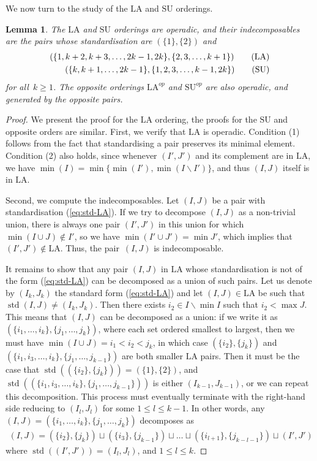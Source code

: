 \documentclass{amsart}
\newtheorem{lemma}[theorem]{Lemma}
\theoremstyle{definition}
\newcommand{\ssm}{\smallsetminus} %
\DeclareMathOperator{\std}{std}
\newcommand{\SU}{\mathrm{SU}}
\newcommand{\LA}{\mathrm{LA}}
\begin{document}
We now turn to the study of the $\LA$ and $\SU$ orderings.

\begin{lemma} 
\label{lem:operadic-ordering}
The $\LA$ and $\SU$ orderings are operadic, and their indecomposables are the pairs whose standardisation are $(\{1\},\{2\})$ and
\begin{align}
(\{1,k+2,k+3,\dots,2k-1,2k\}, \{2,3,\dots,k+1\}) \tag{$\LA$} \label{eq:std-LA} \\
(\{k,k+1,\dots,2k-1\},\{1,2,3,\dots,k-1,2k\}) \tag{$\SU$}
\end{align} 
for all~$k\geq 1$. 
The opposite orderings $\LA^{op}$ and $\SU^{op}$ are also operadic, and generated by the opposite pairs.
\end{lemma}

\begin{proof}
We present the proof for the $\LA$ ordering, the proofs for the $\SU$ and opposite orders are similar.
First, we verify that $\LA$ is operadic. 
Condition (1) follows from the fact that standardising a pair preserves its minimal element.
Condition (2) also holds, since whenever $(I',J')$ and its complement are in $\LA$, we have $\min(I)=\min\{\min(I'),\min(I\ssm I')\}$, and thus $(I,J)$ itself is in $\LA$.

Second, we compute the indecomposables. 
Let $(I,J)$ be a pair with standardisation (\ref{eq:std-LA}).
If we try to decompose $(I,J)$ as a non-trivial union, there is always one pair $(I',J')$ in this union for which~$\min (I\cup J) \notin I'$, so we have $\min ( I' \cup J') = \min J'$, which implies that $(I',J') \notin \LA$.
Thus, the pair~$(I,J)$ is indecomposable. 

It remains to show that any pair $(I,J)$ in $\LA$ whose standardisation is not of the form (\ref{eq:std-LA}) can be decomposed as a union of such pairs. 
Let us denote by $(I_k,J_k)$ the standard form (\ref{eq:std-LA}) and let $(I,J)\in \LA$ be such that $\std(I,J) \neq (I_k,J_k)$.
Then there exists $i_2 \in I\ssm \min I$ such that $i_2 < \max J$.
This means that $(I,J)$ can be decomposed as a union: if we write it as $(\{i_1,\dots,i_k\},\{j_1,\dots,j_k\})$, where each set ordered smallest to largest, then we must have $\min (I\cup J)=i_1<i_2<j_k$, in which case $(\{i_2\},\{j_k\})$ and $(\{i_1,i_3,\dots,i_k\},\{j_1,\dots,j_{k-1}\})$ are both smaller $\LA$ pairs.
Then it must be the case that $\std((\{i_2\},\{j_k\})) = (\{1\},\{2\})$, and $\std((\{i_1,i_3,\dots,i_k\},\{j_1,\dots,j_{k-1}\}))$ is either $(I_{k-1},J_{k-1})$, or we can repeat this decomposition.
This process must eventually terminate with the right-hand side reducing to $(I_l,J_l)$ for some $1 \leq l \leq k-1$.
In other words, any ${(I,J) = (\{i_1,\dots,i_k\}, \{j_1,\dots,j_k\})}$ decomposes as
\begin{align*}
	(I,J) = (\{i_2\},\{j_k\}) \sqcup (\{i_3\},\{j_{k-1}\}) \sqcup \dots \sqcup (\{i_{l+1} \},\{j_{k-l-1} \}) \sqcup (I',J')
\end{align*}
where $\std((I',J')) = (I_l,J_l)$, and $1\leq l \leq k$.
\end{proof}
\end{document}
